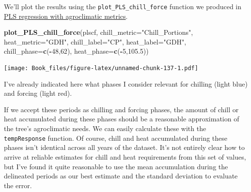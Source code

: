 \documentclass[
]{book}
\newenvironment{Shaded}{\begin{snugshade}}{\end{snugshade}}
\newcommand{\DataTypeTok}[1]{\textcolor[rgb]{0.13,0.29,0.53}{#1}}
\newcommand{\DecValTok}[1]{\textcolor[rgb]{0.00,0.00,0.81}{#1}}
\newcommand{\FloatTok}[1]{\textcolor[rgb]{0.00,0.00,0.81}{#1}}
\newcommand{\KeywordTok}[1]{\textcolor[rgb]{0.13,0.29,0.53}{\textbf{#1}}}
\newcommand{\NormalTok}[1]{#1}
\newcommand{\OperatorTok}[1]{\textcolor[rgb]{0.81,0.36,0.00}{\textbf{#1}}}
\newcommand{\StringTok}[1]{\textcolor[rgb]{0.31,0.60,0.02}{#1}}
\begin{document}
We'll plot the results using the \texttt{plot\_PLS\_chill\_force} function we produced in \protect\hyperlink{pls_chillforce}{PLS regression with agroclimatic metrics}.

\begin{Shaded}
\begin{Highlighting}[]
\KeywordTok{plot_PLS_chill_force}\NormalTok{(plscf,}
                     \DataTypeTok{chill_metric=}\StringTok{"Chill_Portions"}\NormalTok{,}
                     \DataTypeTok{heat_metric=}\StringTok{"GDH"}\NormalTok{,}
                     \DataTypeTok{chill_label=}\StringTok{"CP"}\NormalTok{,}
                     \DataTypeTok{heat_label=}\StringTok{"GDH"}\NormalTok{,}
                     \DataTypeTok{chill_phase=}\KeywordTok{c}\NormalTok{(}\OperatorTok{-}\DecValTok{48}\NormalTok{,}\DecValTok{62}\NormalTok{),}
                     \DataTypeTok{heat_phase=}\KeywordTok{c}\NormalTok{(}\OperatorTok{-}\DecValTok{5}\NormalTok{,}\FloatTok{105.5}\NormalTok{))}
\end{Highlighting}
\end{Shaded}

\texttt{[image: Book\_files/figure-latex/unnamed-chunk-137-1.pdf]}

I've already indicated here what phases I consider relevant for chilling (light blue) and forcing (light red).

If we accept these periods as chilling and forcing phases, the amount of chill or heat accumulated during these phases should be a reasonable approximation of the tree's agroclimatic needs. We can easily calculate these with the \texttt{tempResponse} function. Of course, chill and heat accumulated during these phases isn't identical across all years of the dataset. It's not entirely clear how to arrive at reliable estimates for chill and heat requirements from this set of values, but I've found it quite reasonable to use the mean accumulation during the delineated periods as our best estimate and the standard deviation to evaluate the error.
\end{document}

